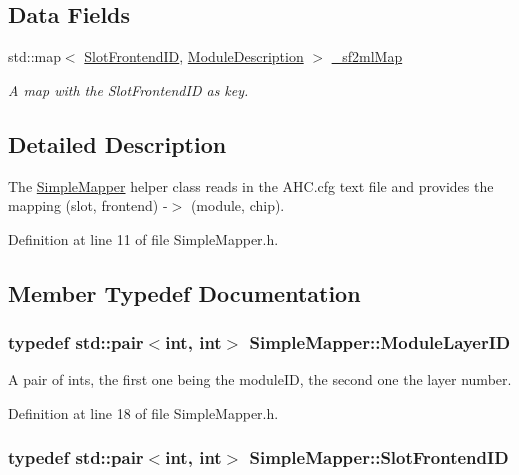 \subsection*{Data Fields}
\begin{DoxyCompactItemize}
\item 
std::map$<$ \hyperlink{class_simple_mapper_a2b973730223591df7c876a6dfbb922a0}{SlotFrontendID}, \hyperlink{struct_simple_mapper_1_1_module_description}{ModuleDescription} $>$ \hyperlink{class_simple_mapper_abc72184f9c3735233e2d21ef36161699}{\_\-sf2mlMap}
\begin{DoxyCompactList}\small\item\em A map with the SlotFrontendID as key. \item\end{DoxyCompactList}\end{DoxyCompactItemize}


\subsection{Detailed Description}
The \hyperlink{class_simple_mapper}{SimpleMapper} helper class reads in the AHC.cfg text file and provides the mapping (slot, frontend) -\/$>$ (module, chip). 

Definition at line 11 of file SimpleMapper.h.

\subsection{Member Typedef Documentation}
\hypertarget{class_simple_mapper_a6fbef133414fb482f870ab56e7237682}{
\subsubsection[{ModuleLayerID}]{\setlength{\rightskip}{0pt plus 5cm}typedef std::pair$<$int, int$>$ {\bf SimpleMapper::ModuleLayerID}}}
\label{class_simple_mapper_a6fbef133414fb482f870ab56e7237682}


A pair of ints, the first one being the moduleID, the second one the layer number. 

Definition at line 18 of file SimpleMapper.h.\hypertarget{class_simple_mapper_a2b973730223591df7c876a6dfbb922a0}{
\subsubsection[{SlotFrontendID}]{\setlength{\rightskip}{0pt plus 5cm}typedef std::pair$<$int, int$>$ {\bf SimpleMapper::SlotFrontendID}}}
\label{class_simple_mapper_a2b973730223591df7c876a6dfbb922a0}


